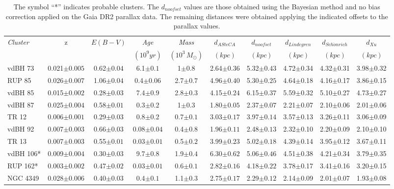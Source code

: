 \documentclass[draft]{aa}
\begin{document}
\begin{table}[ht]
\small
\centering
\begin{tabular}{lccccccccc}
\hline
 \emph{Cluster} & z & $E(B-V)$ & \emph{Age} & \emph{Mass} &
 $d_{ASteCA}$ & $d_{noofset}$ & $d_{Lindegren}$ & $d_{Sch\ddot{o}nrich}$ &
 $d_{Xu}$ \\
& & & $(10^9 yr)$ & $(10^3\,M_{\odot})$ & $(kpc)$ & $(kpc)$ & $(kpc)$ &
$(kpc)$ & $(kpc)$\\
 \hline\hline
 vdBH 73 & 0.021$\pm0.005$ & 0.62$\pm0.04$ & 6.1$\pm0.1$ & 1$\pm0.8$ &
 2.64$\pm0.36$ & 5.32$\pm0.43$ & 4.72$\pm$0.34 & 4.32$\pm$0.31 & 3.98$\pm$0.32\\
 RUP 85 & 0.026$\pm0.007$ & 1.06$\pm0.04$ & 0.4$\pm0.06$ & 2.7$\pm0.7$ &
 4.96$\pm0.40$ & 5.30$\pm0.25$ & 4.64$\pm$0.18 & 4.16$\pm$0.17 & 3.86$\pm$0.15\\
 vdBH 85 & 0.015$\pm0.002$ & 0.28$\pm0.03$ & 7.4$\pm0.9$ & 2.8$\pm0.3$ &
 4.15$\pm0.24$ & 6.15$\pm0.37$ & 5.59$\pm$0.32 & 5.10$\pm$0.27 & 4.73$\pm$0.27\\
 vdBH 87 & 0.025$\pm0.004$ & 0.58$\pm0.01$ & 0.3$\pm0.2$ & 1$\pm0.3$ &
 1.80$\pm0.05$ & 2.37$\pm0.07$ & 2.21$\pm$0.07 & 2.10$\pm$0.06 & 2.01$\pm$0.06\\
 TR 12 & 0.006$\pm0.001$ & 0.29$\pm0.03$ & 0.8$\pm0.2$ & 0.7$\pm0.1$ &
 3.03$\pm0.17$ & 3.97$\pm0.14$ & 3.57$\pm$0.13 & 3.26$\pm$0.11 & 3.06$\pm$0.09\\
 vdBH 92 & 0.007$\pm0.003$ & 0.66$\pm0.03$ & 0.08$\pm0.04$ & 0.4$\pm0.8$ &
 1.96$\pm0.11$ & 2.48$\pm0.13$ & 2.32$\pm$0.10 & 2.20$\pm$0.09 & 2.10$\pm$0.10\\
 TR 13 & 0.007$\pm0.003$ & 0.55$\pm0.01$ & 0.03$\pm0.01$ & 0.5$\pm0.2$ &
 3.99$\pm0.23$ & 5.02$\pm0.18$ & 4.39$\pm$0.14 & 3.95$\pm$0.12 & 3.67$\pm$0.11\\
 vdBH 106* & 0.009$\pm0.004$ & 0.30$\pm0.03$ & 9.7$\pm0.8$ & 1.9$\pm0.4$ &
 6.30$\pm0.62$ & 5.06$\pm0.46$ & 4.51$\pm$0.38 & 4.21$\pm$0.34 & 3.79$\pm$0.35\\
 RUP 162* & 0.003$\pm0.002$ & 0.47$\pm0.02$ & 0.03$\pm0.01$ & 0.6$\pm0.1$ &
 2.82$\pm0.16$ & 4.18$\pm0.22$ & 3.78$\pm$0.17 & 3.41$\pm$0.16 & 3.20$\pm$0.15\\
 NGC 4349 & 0.028$\pm0.006$ & 0.40$\pm0.03$ & 0.4$\pm0.1$ & 1.1$\pm0.3$ &
 2.75$\pm0.17$ & 2.29$\pm0.12$ & 2.14$\pm$0.09 & 2.01$\pm$0.07 & 1.93$\pm$0.08\\
 \hline
\end{tabular}
\caption{The symbol ``*'' indicates probable clusters. The $d_{noofset}$ values
are those obtained using the Bayesian method and no bias correction applied on
the Gaia DR2 parallax data. The remaining distances were obtained applying the
indicated offsets to the parallax values.}
\label{tab:final_tab}
\end{table}
\end{document}
